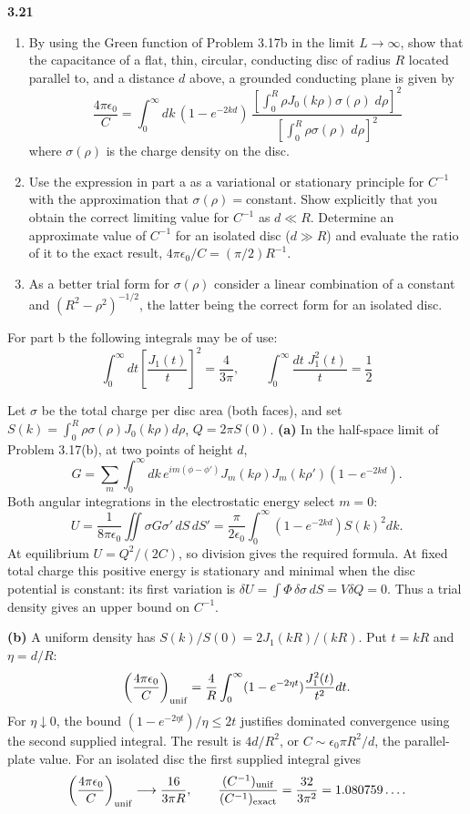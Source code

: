 \par\bigskip
\noindent\textbf{3.21}\quad\begin{enumerate}
\item[(a)] By using the Green function of Problem 3.17b in the limit $L\to\infty$, show that the capacitance of a flat, thin, circular, conducting disc of radius $R$ located parallel to, and a distance $d$ above, a grounded conducting plane is given by
\[
\frac{4\pi\epsilon_{0}}{C}=\int_{0}^{\infty}dk\,(1-e^{-2kd})\,\frac{\left[\displaystyle\int_{0}^{R}\rho J_{0}(k\rho)\sigma(\rho)\;d\rho\right]^{2}}{\left[\displaystyle\int_{0}^{R}\rho\sigma(\rho)\;d\rho\right]^{2}}
\]
where $\sigma(\rho)$ is the charge density on the disc.
\item[(b)] Use the expression in part a as a variational or stationary principle for $C^{-1}$ with the approximation that $\sigma(\rho)={}$constant. Show explicitly that you obtain the correct limiting value for $C^{-1}$ as $d\ll R$. Determine an approximate value of $C^{-1}$ for an isolated disc ($d\gg R$) and evaluate the ratio of it to the exact result, $4\pi\epsilon_{0}/C=(\pi/2)R^{-1}$.
\item[(c)] As a better trial form for $\sigma(\rho)$ consider a linear combination of a constant and $(R^{2}-\rho^{2})^{-1/2}$, the latter being the correct form for an isolated disc.
\end{enumerate}
For part b the following integrals may be of use:
\[
\int_{0}^{\infty}dt\left[\frac{J_{1}(t)}{t}\right]^{2}=\frac{4}{3\pi},\qquad
\int_{0}^{\infty}\frac{dt\;J_{1}^{2}(t)}{t}=\frac{1}{2}
\]
\solution

Let $\sigma$ be the total charge per disc area (both faces), and set
$S(k)=\int_0^R\rho\sigma(\rho)J_0(k\rho)d\rho$,
$Q=2\pi S(0)$.
\textbf{(a)} In the half-space limit of Problem 3.17(b), at two
points of height $d$,
\[
G=\sum_m\int_0^\infty dk\,e^{im(\phi-\phi')}
J_m(k\rho)J_m(k\rho')(1-e^{-2kd}).
\]
Both angular integrations in the electrostatic energy select $m=0$:
\[
U=\frac1{8\pi\epsilon_0}\iint\sigma G\sigma'\,dS\,dS'
=\frac\pi{2\epsilon_0}\int_0^\infty(1-e^{-2kd})S(k)^2dk.
\]
At equilibrium $U=Q^2/(2C)$, so division gives the required formula.
At fixed total charge this positive energy is stationary and minimal
when the disc potential is constant: its first variation is
$\delta U=\int\Phi\,\delta\sigma\,dS=V\delta Q=0$.
Thus a trial density gives an upper bound on $C^{-1}$.

\textbf{(b)} A uniform density has $S(k)/S(0)=2J_1(kR)/(kR)$.
Put $t=kR$ and $\eta=d/R$:
\[
\left(\frac{4\pi\epsilon_0}{C}\right)_{\rm unif}
=\frac4R\int_0^\infty(1-e^{-2\eta t})\frac{J_1^2(t)}{t^2}dt.
\]
For $\eta\downarrow0$, the bound
$(1-e^{-2\eta t})/\eta\leq2t$ justifies dominated convergence
using the second supplied integral.  The result is
$4d/R^2$, or $C\sim\epsilon_0\pi R^2/d$, the parallel-plate value.
For an isolated disc the first supplied integral gives
\[
\left(\frac{4\pi\epsilon_0}{C}\right)_{\rm unif}
\longrightarrow\frac{16}{3\pi R},\qquad
\frac{(C^{-1})_{\rm unif}}{(C^{-1})_{\rm exact}}
=\frac{32}{3\pi^2}=1.080759\ldots.
\]

